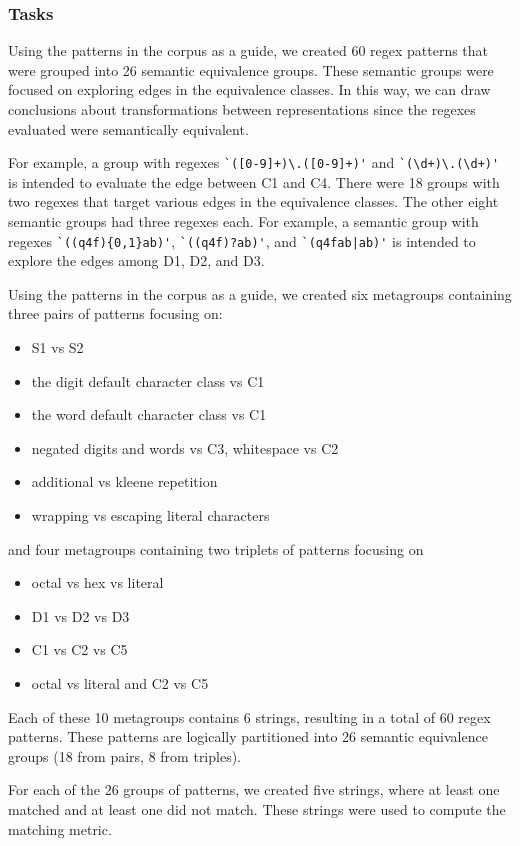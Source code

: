\subsubsection{Tasks}
Using the patterns in the corpus as a guide, we created 60 regex patterns that were grouped into 26 semantic equivalence groups.
These semantic groups were focused on exploring edges in the equivalence classes. In this way, we can draw conclusions about transformations between representations since the regexes evaluated were semantically equivalent.

For example, a  group with regexes \verb!`([0-9]+)\.([0-9]+)'! and  \verb!`(\d+)\.(\d+)'! is intended to evaluate the edge between C1 and C4.
There were 18 groups with two regexes that target various edges in the equivalence classes.
The other eight semantic groups had three regexes each.
For example, a semantic group with regexes \verb!`((q4f){0,1}ab)'!, \verb!`((q4f)?ab)'!, and \verb!`(q4fab|ab)'! is intended to explore the edges among D1, D2, and D3.

Using the patterns in the corpus as a guide, we created six metagroups containing three pairs of patterns focusing on:
\begin{itemize}
\item S1 vs S2
\item the digit default character class vs C1
\item the word default character class vs C1
\item negated digits and words vs C3, whitespace vs C2
\item additional vs kleene repetition
\item wrapping vs escaping literal characters
\end{itemize}
and four metagroups containing two triplets of patterns focusing on
\begin{itemize}
\item octal vs hex vs literal
\item D1 vs D2 vs D3
\item C1 vs C2 vs C5
\item octal vs literal and C2 vs C5
\end{itemize}

Each of these 10 metagroups contains 6 strings, resulting in a total of 60 regex patterns.  These patterns are logically partitioned into 26 semantic equivalence groups (18 from pairs, 8 from triples).

For each of the 26 groups of patterns, we created five strings, where at least one matched and at least one did not match. These strings were used to compute the matching metric.

